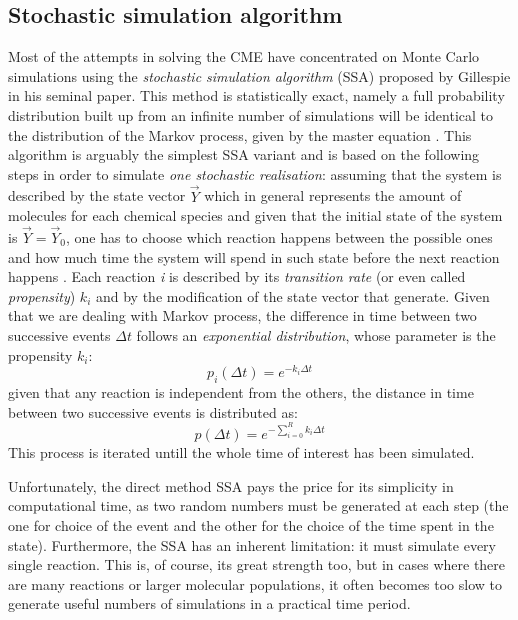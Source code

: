 \documentclass[12pt,a4paper]{report}
\begin{document}
\subsection{Stochastic simulation algorithm}
Most of the attempts in solving the CME have concentrated on Monte Carlo simulations using the \emph{stochastic simulation algorithm} (SSA) proposed by Gillespie in his seminal paper. This method is statistically exact, namely a full probability distribution built up from an infinite number of simulations will be identical to the distribution of the Markov process, given by the master equation \cite{Article}. This algorithm is arguably the simplest SSA variant and is based on the following steps in order to simulate \emph{one stochastic realisation}: assuming that the system is described by the state vector $\Vec{Y}$ which in general represents the amount of molecules for each chemical species and given that the initial state of the system is $\Vec{Y} = \Vec{Y}_{0}$, one has to choose which reaction happens between the possible ones and how much time the system will spend in such state before the next reaction happens \cite{PHD}. Each reaction \emph{i} is described by its \emph{transition rate} (or even called \emph{propensity}) $k_{i}$ and by the modification of the state vector that generate. Given that we are dealing with Markov process, the difference in time between two successive events $\Delta t$ follows an \emph{exponential distribution}, whose parameter is the propensity $k_{i}$:
\begin{equation}
    p_{i}(\Delta t) = e^{-k_{i}\Delta t}
\end{equation}
given that any reaction is independent from the others, the distance in time between two successive events is distributed as:
\begin{equation}
    p(\Delta t) = e^{-\sum_{i=0}^{R} k_{i} \Delta t}
\end{equation}
This process is iterated untill the whole time of interest has been simulated.


Unfortunately, the direct method SSA pays the price for its simplicity in computational time, as two random numbers must be generated at each step \cite{Article} (the one for choice of the event and the other for the choice of the time spent in the state). Furthermore, the SSA has an inherent limitation: it must simulate every single reaction. This is, of course, its great strength too, but in cases where there are many reactions or larger molecular populations, it often becomes too slow to generate useful numbers of simulations in a practical time period.
\end{document}
